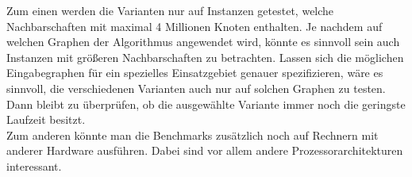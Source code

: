 Zum einen werden die Varianten nur auf Instanzen getestet, welche Nachbarschaften mit 
maximal 4 Millionen Knoten enthalten. Je nachdem auf welchen Graphen der Algorithmus angewendet wird, 
könnte es sinnvoll sein auch Instanzen
mit größeren Nachbarschaften zu betrachten. Lassen sich die möglichen Eingabegraphen
für ein spezielles Einsatzgebiet genauer spezifizieren, wäre es sinnvoll, die verschiedenen
Varianten auch nur auf solchen Graphen zu testen. Dann bleibt zu überprüfen, ob die ausgewählte
Variante immer noch die geringste Laufzeit besitzt.
\\

Zum anderen könnte man die Benchmarks zusätzlich noch auf Rechnern mit anderer Hardware ausführen.
Dabei sind vor allem andere Prozessorarchitekturen interessant.
